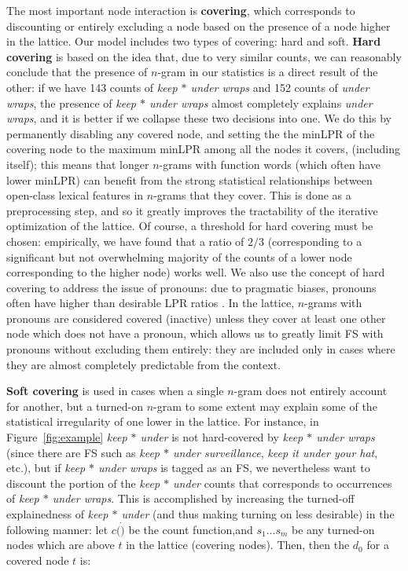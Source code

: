 \documentclass[11pt,letterpaper]{article}
\makeatletter
\def \etc {etc.\@ }
\newcommand{\dotts}{...}
\newcommand{\gap}{$*$\xspace}
\newcommand{\ex}[1]{\textit{#1}\xspace}
\newcommand{\termdef}[1]{\textbf{#1}\xspace}
\newcommand{\figref}[2][]{Figure#1~\ref{#2}\xspace}
\makeatother
\begin{document}
The most important node interaction is \termdef{covering}, which corresponds to discounting or entirely excluding a node based on the presence of a node higher in the lattice. Our model includes two types of covering: hard and soft. \termdef{Hard covering} is based on the idea that, due to very similar counts, we can reasonably conclude that the presence of $n$-gram in our statistics is a direct result of the other: if we have 143 counts of \ex{keep \gap under wraps} and 152 counts of \ex{under wraps}, the presence of \ex{keep \gap under wraps} almost completely explains \ex{under wraps}, and it is better if we collapse these two decisions into one. We do this by permanently disabling any covered node, and setting the the minLPR of the covering node to the maximum minLPR among all the nodes it covers, (including itself); this means that longer $n$-grams with function words (which often have lower minLPR) can benefit from the strong statistical relationships between open-class lexical features in $n$-grams that they cover. This is done as a preprocessing step, and so it greatly improves the tractability of the iterative optimization of the lattice. Of course, a threshold for hard covering must be chosen: empirically, we have found that a ratio of $2/3$ (corresponding to a significant but not overwhelming majority of the counts of a lower node corresponding to the higher node) works well.  We also use the concept of hard covering to address the issue of pronouns: due to pragmatic biases, pronouns often have higher than desirable LPR ratios \cite{Brooke15b}. In the lattice, $n$-grams with pronouns are considered covered (inactive) unless they cover at least one other node which does not have a pronoun, which allows us to greatly limit FS with pronouns without excluding them entirely: they are included only in cases where they are almost completely predictable from the context. 


\termdef{Soft covering} is used in cases when a single $n$-gram does not entirely account for another, but a turned-on $n$-gram to some extent may explain some of the statistical irregularity of one lower in the lattice. For instance, in \figref{fig:example} \ex{keep \gap under} is not hard-covered by \ex{keep \gap under wraps} (since there are FS such as \ex{keep \gap under surveillance}, \ex{keep it under your hat}, \etc), but if \ex{keep \gap under wraps} is tagged as an FS, we nevertheless want to discount the portion of the \ex{keep \gap under} counts that corresponds to occurrences of \ex{keep \gap under wraps}. This is accomplished by increasing the turned-off explainedness of \ex{keep \gap under} (and thus making turning on less desirable) in the following manner: let $c(\dot)$ be the count function,and $s_1\dotts s_m$ be any turned-on nodes which are above $t$ in the lattice (covering nodes). Then, then the $d_0$ for a covered node $t$ is:
\end{document}
